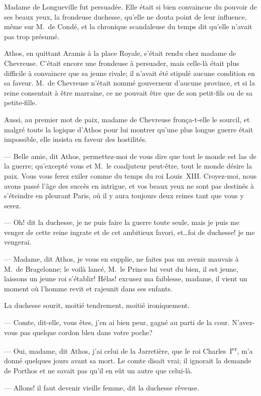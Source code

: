 Madame de Longueville fut persuadée. Elle était si bien convaincue du pouvoir de ses beaux yeux, la frondeuse duchesse, qu'elle ne douta point de leur influence, même sur M.~de Condé, et la chronique scandaleuse du temps dit qu'elle n'avait pas trop présumé.

Athos, en quittant Aramis à la place Royale, s'était rendu chez madame de Chevreuse. C'était encore une frondeuse à persuader, mais celle-là était plus difficile à convaincre que sa jeune rivale; il n'avait été stipulé aucune condition en sa faveur. M.~de Chevreuse n'était nommé gouverneur d'aucune province, et si la reine consentait à être marraine, ce ne pouvait être que de son petit-fils ou de sa petite-fille.

Aussi, au premier mot de paix, madame de Chevreuse fronça-t-elle le sourcil, et malgré toute la logique d'Athos pour lui montrer qu'une plus longue guerre était impossible, elle insista en faveur des hostilités.

— Belle amie, dit Athos, permettez-moi de vous dire que tout le monde est las de la guerre; qu'excepté vous et M.~le coadjuteur peut-être, tout le monde désire la paix. Vous vous ferez exiler comme du temps du roi Louis~XIII. Croyez-moi, nous avons passé l'âge des succès en intrigue, et vos beaux yeux ne sont pas destinés à s'éteindre en pleurant Paris, où il y aura toujours deux reines tant que vous y serez.

— Oh! dit la duchesse, je ne puis faire la guerre toute seule, mais je puis me venger de cette reine ingrate et de cet ambitieux favori, et\dots foi de duchesse! je me vengerai.

— Madame, dit Athos, je vous en supplie, ne faites pas un avenir mauvais à M.~de Bragelonne; le voilà lancé, M.~le Prince lui veut du bien, il est jeune, laissons un jeune roi s'établir! Hélas! excusez ma faiblesse, madame, il vient un moment où l'homme revit et rajeunit dans ses enfants.

La duchesse sourit, moitié tendrement, moitié ironiquement.

— Comte, dit-elle, vous êtes, j'en ai bien peur, gagné au parti de la cour. N'avez-vous pas quelque cordon bleu dans votre poche?

— Oui, madame, dit Athos, j'ai celui de la Jarretière, que le roi Charles~I\textsuperscript{er}, m'a donné quelques jours avant sa mort.
Le comte disait vrai; il ignorait la demande de Porthos et ne savait pas qu'il en eût un autre que celui-là.

— Allons! il faut devenir vieille femme, dit la duchesse rêveuse.

